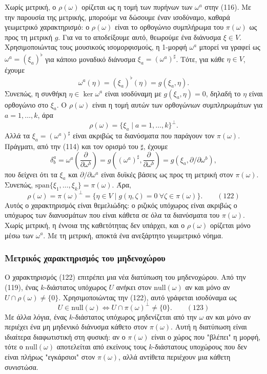 \documentclass[12pt]{article}
\begin{document}
Χωρίς μετρική, ο $\rho(\omega)$ ορίζεται ως η τομή των πυρήνων των $\omega^a$ στην (116). Με την παρουσία της μετρικής, μπορούμε να δώσουμε έναν ισοδύναμο, καθαρά γεωμετρικό χαρακτηρισμό: ο $\rho(\omega)$ είναι το ορθογώνιο συμπλήρωμα του $\pi(\omega)$ ως προς τη μετρική $g$. Για να το αποδείξουμε αυτό, θεωρούμε ένα διάνυσμα $\xi \in V$. Χρησιμοποιώντας τους μουσικούς ισομορφισμούς, η 1-μορφή $\omega^a$ μπορεί να γραφεί ως $\omega^a = (\xi_a)^\flat$ για κάποιο μοναδικό διάνυσμα $\xi_a = (\omega^a)^\sharp$. Τότε, για κάθε $\eta \in V$, έχουμε
\[
\omega^a(\eta) = (\xi_a)^\flat(\eta) = g(\xi_a, \eta).
\]
Συνεπώς, η συνθήκη $\eta \in \ker \omega^a$ είναι ισοδύναμη με $g(\xi_a, \eta) = 0$, δηλαδή το $\eta$ είναι ορθογώνιο στο $\xi_a$. Ο $\rho(\omega)$ είναι η τομή αυτών των ορθογώνιων συμπληρωμάτων για $a = 1, \dots, k$, άρα
\[
\rho(\omega) = \{ \xi_a \mid a = 1, \dots, k \}^\perp.
\]
Αλλά τα $\xi_a = (\omega^a)^\sharp$ είναι ακριβώς τα διανύσματα που παράγουν τον $\pi(\omega)$. Πράγματι, από την (114) και τον ορισμό του $\sharp$, έχουμε
\[
\delta^a_b = \omega^a \left( \frac{\partial}{\partial \omega^b} \right) = g \left( (\omega^a)^\sharp, \frac{\partial}{\partial \omega^b} \right) = g(\xi_a, \partial / \partial \omega^b),
\]
που δείχνει ότι τα $\xi_a$ και $\partial / \partial \omega^a$ είναι δυϊκές βάσεις ως προς τη μετρική στον $\pi(\omega)$. Συνεπώς, $\text{span}\{\xi_1, \dots, \xi_k\} = \pi(\omega)$. Άρα,
\begin{equation}
\rho(\omega) = \pi(\omega)^\perp = \{ \eta \in V \mid g(\eta, \zeta) = 0 \ \forall \zeta \in \pi(\omega) \}. \qquad (122)
\end{equation}
Αυτός ο χαρακτηρισμός είναι θεμελιώδης: ο ριζικός υπόχωρος είναι ακριβώς ο υπόχωρος των διανυσμάτων που είναι κάθετα σε όλα τα διανύσματα του $\pi(\omega)$. Χωρίς μετρική, η έννοια της καθετότητας δεν υπάρχει, και ο $\rho(\omega)$ ορίζεται μόνο μέσω των $\omega^a$. Με τη μετρική, αποκτά ένα ανεξάρτητο γεωμετρικό νόημα.

\subsubsection{Μετρικός χαρακτηρισμός του μηδενοχώρου}

Ο χαρακτηρισμός (122) επιτρέπει μια νέα διατύπωση του μηδενοχώρου. Από την (119), ένας $k$-διάστατος υπόχωρος $U$ ανήκει στον $\text{null}(\omega)$ αν και μόνο αν $U \cap \rho(\omega) \neq \{0\}$. Χρησιμοποιώντας την (122), αυτό γράφεται ισοδύναμα ως
\begin{equation}
U \in \text{null}(\omega) \iff U \cap \pi(\omega)^\perp \neq \{0\}. \qquad (123)
\end{equation}
Με άλλα λόγια, ένας $k$-διάστατος υπόχωρος μηδενίζεται από την $\omega$ αν και μόνο αν περιέχει ένα μη μηδενικό διάνυσμα κάθετο στον $\pi(\omega)$. Αυτή η διατύπωση είναι ιδιαίτερα διαφωτιστική στη φυσική: αν ο $\pi(\omega)$ είναι ο χώρος που "βλέπει" η μορφή, τότε ο $\text{null}(\omega)$ αποτελείται από εκείνους τους $k$-διάστατους υποχώρους που δεν είναι πλήρως "εγκάρσιοι" στον $\pi(\omega)$, αλλά αντίθετα περιέχουν μια κάθετη συνιστώσα.
\end{document}
